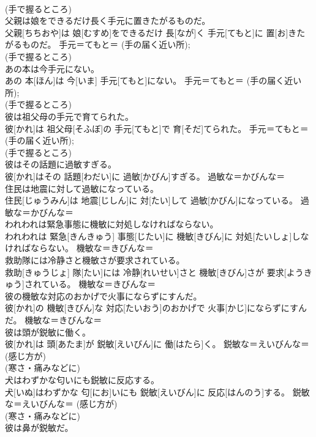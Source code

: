 \documentclass[8pt]{extreport}
\begin{document}
\begin{CJK}{UTF8}{min}
{\\	(手で握るところ) 
\\	父親は娘をできるだけ長く手元に置きたがるものだ。	
\\	父親[ちちおや]は 娘[むすめ]をできるだけ 長[なが]く 手元[てもと]に 置[お]きたがるものだ。	手元＝てもと＝ (手の届く近い所); 
\\	(手で握るところ) 
\\	あの本は今手元にない。	
\\	あの 本[ほん]は 今[いま] 手元[てもと]にない。	手元＝てもと＝ (手の届く近い所); 
\\	(手で握るところ) 
\\	彼は祖父母の手元で育てられた。	
\\	彼[かれ]は 祖父母[そふぼ]の 手元[てもと]で 育[そだ]てられた。	手元＝てもと＝ (手の届く近い所); 
\\	(手で握るところ) 
\\	彼はその話題に過敏すぎる。	
\\	彼[かれ]はその 話題[わだい]に 過敏[かびん]すぎる。	過敏な＝かびんな＝ 
\\	住民は地震に対して過敏になっている。	
\\	住民[じゅうみん]は 地震[じしん]に 対[たい]して 過敏[かびん]になっている。	過敏な＝かびんな＝ 
\\	われわれは緊急事態に機敏に対処しなければならない。	
\\	われわれは 緊急[きんきゅう] 事態[じたい]に 機敏[きびん]に 対処[たいしょ]しなければならない。	機敏な＝きびんな＝ 
\\	救助隊には冷静さと機敏さが要求されている。	
\\	救助[きゅうじょ] 隊[たい]には 冷静[れいせい]さと 機敏[きびん]さが 要求[ようきゅう]されている。	機敏な＝きびんな＝ 
\\	彼の機敏な対応のおかげで火事にならずにすんだ。	
\\	彼[かれ]の 機敏[きびん]な 対応[たいおう]のおかげで 火事[かじ]にならずにすんだ。	機敏な＝きびんな＝ 
\\	彼は頭が鋭敏に働く。	
\\	彼[かれ]は 頭[あたま]が 鋭敏[えいびん]に 働[はたら]く。	鋭敏な＝えいびんな＝ (感じ方が) 
\\	(寒さ・痛みなどに) 
\\	犬はわずかな匂いにも鋭敏に反応する。	
\\	犬[いぬ]はわずかな 匂[にお]いにも 鋭敏[えいびん]に 反応[はんのう]する。	鋭敏な＝えいびんな＝ (感じ方が) 
\\	(寒さ・痛みなどに) 
\\	彼は鼻が鋭敏だ。	
}
\end{CJK}
\end{document}
